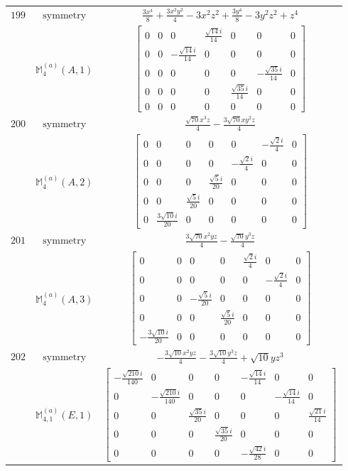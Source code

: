 \documentclass[fleqn,8pt,landscape]{jsarticle}
\begin{document}
\begin{longtable}{ccc}
$ 199 $ & $ \text{symmetry} $ & $ \frac{3 x^{4}}{8} + \frac{3 x^{2} y^{2}}{4} - 3 x^{2} z^{2} + \frac{3 y^{4}}{8} - 3 y^{2} z^{2} + z^{4} $ \\
$  $ & $ \mathbb{M}_{4}^{(a)}(A,1) $ & $ \begin{bmatrix} 0 & 0 & 0 & \frac{\sqrt{14} i}{14} & 0 & 0 & 0 \\ 0 & 0 & - \frac{\sqrt{14} i}{14} & 0 & 0 & 0 & 0 \\ 0 & 0 & 0 & 0 & 0 & - \frac{\sqrt{35} i}{14} & 0 \\ 0 & 0 & 0 & 0 & \frac{\sqrt{35} i}{14} & 0 & 0 \\ 0 & 0 & 0 & 0 & 0 & 0 & 0 \end{bmatrix} $ \\ \hline
$ 200 $ & $ \text{symmetry} $ & $ \frac{\sqrt{70} x^{3} z}{4} - \frac{3 \sqrt{70} x y^{2} z}{4} $ \\
$  $ & $ \mathbb{M}_{4}^{(a)}(A,2) $ & $ \begin{bmatrix} 0 & 0 & 0 & 0 & 0 & - \frac{\sqrt{2} i}{4} & 0 \\ 0 & 0 & 0 & 0 & - \frac{\sqrt{2} i}{4} & 0 & 0 \\ 0 & 0 & 0 & \frac{\sqrt{5} i}{20} & 0 & 0 & 0 \\ 0 & 0 & \frac{\sqrt{5} i}{20} & 0 & 0 & 0 & 0 \\ 0 & \frac{3 \sqrt{10} i}{20} & 0 & 0 & 0 & 0 & 0 \end{bmatrix} $ \\ \hline
$ 201 $ & $ \text{symmetry} $ & $ \frac{3 \sqrt{70} x^{2} y z}{4} - \frac{\sqrt{70} y^{3} z}{4} $ \\
$  $ & $ \mathbb{M}_{4}^{(a)}(A,3) $ & $ \begin{bmatrix} 0 & 0 & 0 & 0 & \frac{\sqrt{2} i}{4} & 0 & 0 \\ 0 & 0 & 0 & 0 & 0 & - \frac{\sqrt{2} i}{4} & 0 \\ 0 & 0 & - \frac{\sqrt{5} i}{20} & 0 & 0 & 0 & 0 \\ 0 & 0 & 0 & \frac{\sqrt{5} i}{20} & 0 & 0 & 0 \\ - \frac{3 \sqrt{10} i}{20} & 0 & 0 & 0 & 0 & 0 & 0 \end{bmatrix} $ \\ \hline
$ 202 $ & $ \text{symmetry} $ & $ - \frac{3 \sqrt{10} x^{2} y z}{4} - \frac{3 \sqrt{10} y^{3} z}{4} + \sqrt{10} y z^{3} $ \\
$  $ & $ \mathbb{M}_{4,1}^{(a)}(E,1) $ & $ \begin{bmatrix} - \frac{\sqrt{210} i}{140} & 0 & 0 & 0 & - \frac{\sqrt{14} i}{14} & 0 & 0 \\ 0 & - \frac{\sqrt{210} i}{140} & 0 & 0 & 0 & - \frac{\sqrt{14} i}{14} & 0 \\ 0 & 0 & \frac{\sqrt{35} i}{20} & 0 & 0 & 0 & \frac{\sqrt{21} i}{14} \\ 0 & 0 & 0 & \frac{\sqrt{35} i}{20} & 0 & 0 & 0 \\ 0 & 0 & 0 & 0 & - \frac{\sqrt{42} i}{28} & 0 & 0 \end{bmatrix} $ \\ \hline

\end{longtable}
\end{document}
